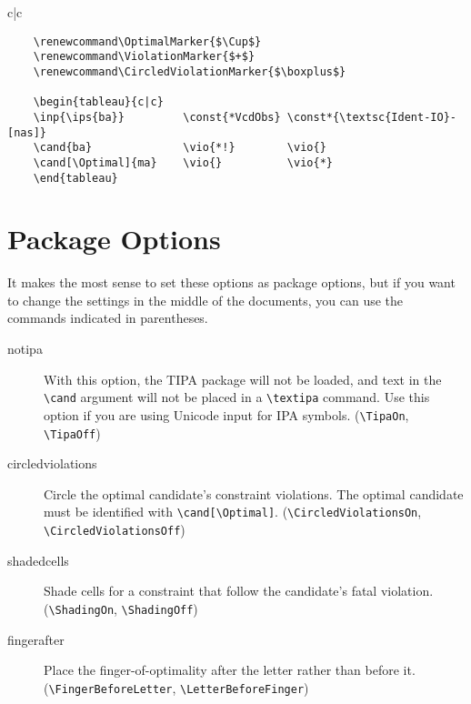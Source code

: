 \documentclass{article}
\begin{document}
\begin{center}
	\CircledViolationsOn
	\renewcommand\OptimalMarker{$\Cup$}
	\renewcommand\ViolationMarker{$+$}
	\renewcommand\CircledViolationMarker{$\boxplus$}
	\begin{tableau}{c|c}
	          
	       \vio{*!}        \vio{}
	  \vio{}          \vio{*}
	\end{tableau}
	\CircledViolationsOff
\end{center}

\begin{verbatim}
	\renewcommand\OptimalMarker{$\Cup$}
	\renewcommand\ViolationMarker{$+$}
	\renewcommand\CircledViolationMarker{$\boxplus$}
	
	\begin{tableau}{c|c}
	\inp{\ips{ba}}         \const{*VcdObs} \const*{\textsc{Ident-IO}-[nas]}
	\cand{ba}              \vio{*!}        \vio{}
	\cand[\Optimal]{ma}    \vio{}          \vio{*}
	\end{tableau}
\end{verbatim}

\section{Package Options}
It makes the most sense to set these options as package options, but if you want to change the settings in the middle of the documents, you can use the commands indicated in parentheses.

\begin{description}
\item[notipa] With this option, the TIPA package will not be loaded, and text in the \verb+\cand+ argument will not be placed in a  \verb+\textipa+ command. Use this option if you are using Unicode input for IPA symbols. (\verb+\TipaOn+, \verb+\TipaOff+)
\item[circledviolations] Circle the optimal candidate's constraint violations. The optimal candidate must be identified with \verb+\cand[\Optimal]+. (\verb+\CircledViolationsOn+, \verb+\CircledViolationsOff+)
\item[shadedcells] Shade cells for a constraint that follow the candidate's fatal violation. (\verb+\ShadingOn+, \verb+\ShadingOff+)
\item[fingerafter] Place the finger-of-optimality after the letter rather than before it. (\verb+\FingerBeforeLetter+, \verb+\LetterBeforeFinger+)
\end{description}
\end{document}

